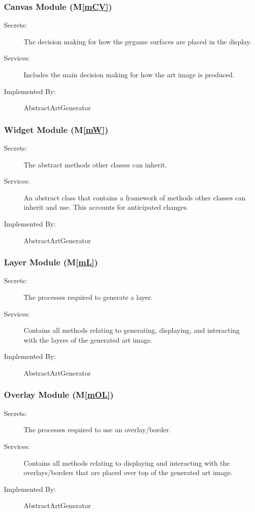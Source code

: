 \documentclass[12pt, titlepage]{article}
\newcommand{\mref}[1]{M\ref{#1}}
\begin{document}
\subsubsection{Canvas Module (\mref{mCV})}

\begin{description}
\item[Secrets:] The decision making for how the pygame surfaces are placed in the display.
\item[Services:] Includes the main decision making for how the art image is produced.
\item[Implemented By:] AbstractArtGenerator
\end{description}

\subsubsection{Widget Module (\mref{mW})}

\begin{description}
\item[Secrets:] The abstract methods other classes can inherit.
\item[Services:] An abstract class that contains a framework of methods other classes can inherit and use. This accounts for anticipated changes.
\item[Implemented By:] AbstractArtGenerator
\end{description}

\subsubsection{Layer Module (\mref{mL})}

\begin{description}
\item[Secrets:] The processes required to generate a layer.
\item[Services:] Contains all methods relating to generating, displaying, and interacting with the layers of the generated art image.
\item[Implemented By:] AbstractArtGenerator
\end{description}

\subsubsection{Overlay Module (\mref{mOL})}

\begin{description}
\item[Secrets:] The processes required to use an overlay/border.
\item[Services:] Contains all methods relating to displaying and interacting with the overlays/borders that are placed over top of the generated art image.
\item[Implemented By:] AbstractArtGenerator
\end{description}
\end{document}
